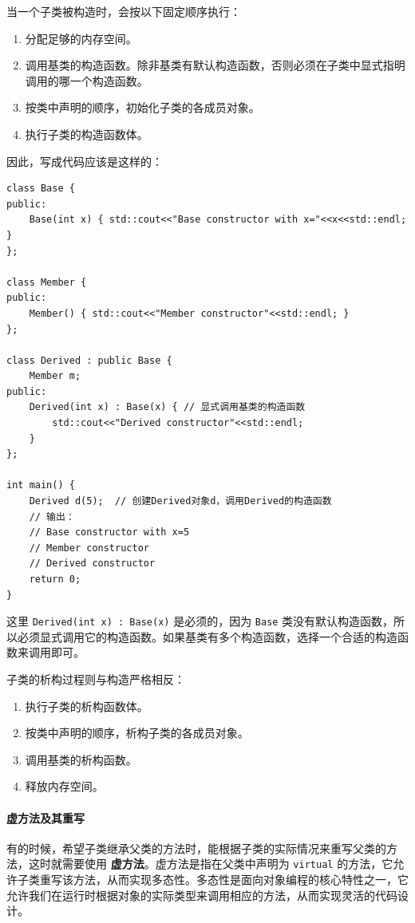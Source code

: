 当一个子类被构造时，会按以下固定顺序执行：
\begin{enumerate}
    \item 分配足够的内存空间。
    \item 调用基类的构造函数。除非基类有默认构造函数，否则必须在子类中显式指明调用的哪一个构造函数。
    \item 按类中声明的顺序，初始化子类的各成员对象。
    \item 执行子类的构造函数体。
\end{enumerate}

因此，写成代码应该是这样的：
\begin{verbatim}
class Base {
public:
    Base(int x) { std::cout<<"Base constructor with x="<<x<<std::endl; }
};

class Member {
public:
    Member() { std::cout<<"Member constructor"<<std::endl; }
};

class Derived : public Base {
    Member m;
public:
    Derived(int x) : Base(x) { // 显式调用基类的构造函数
        std::cout<<"Derived constructor"<<std::endl;
    }
};

int main() {
    Derived d(5);  // 创建Derived对象d，调用Derived的构造函数
    // 输出：
    // Base constructor with x=5
    // Member constructor
    // Derived constructor
    return 0;
}
\end{verbatim}
这里 \texttt{Derived(int x) : Base(x)} 是必须的，因为 \verb|Base| 类没有默认构造函数，所以必须显式调用它的构造函数。如果基类有多个构造函数，选择一个合适的构造函数来调用即可。

子类的析构过程则与构造严格相反：
\begin{enumerate}
    \item 执行子类的析构函数体。
    \item 按类中声明的顺序，析构子类的各成员对象。
    \item 调用基类的析构函数。
    \item 释放内存空间。
\end{enumerate}

\paragraph{虚方法及其重写} 有的时候，希望子类继承父类的方法时，能根据子类的实际情况来重写父类的方法，这时就需要使用 \textbf{虚方法}。虚方法是指在父类中声明为 \verb|virtual| 的方法，它允许子类重写该方法，从而实现多态性。多态性是面向对象编程的核心特性之一，它允许我们在运行时根据对象的实际类型来调用相应的方法，从而实现灵活的代码设计。

